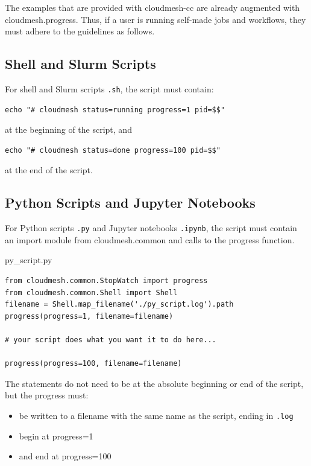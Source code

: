 The examples that are provided with cloudmesh-cc are already augmented
with cloudmesh.progress. Thus, if a user is running self-made jobs and
workflows, they must adhere to the guidelines as follows.

\subsection{Shell and Slurm Scripts}\label{shell-and-slurm-scripts}

For shell and Slurm scripts \texttt{.sh}, the script must contain:

\begin{verbatim}
echo "# cloudmesh status=running progress=1 pid=$$"
\end{verbatim}

at the beginning of the script, and

\begin{verbatim}
echo "# cloudmesh status=done progress=100 pid=$$"
\end{verbatim}

at the end of the script.

\subsection{Python Scripts and Jupyter
Notebooks}\label{python-scripts-and-jupyter-notebooks}

For Python scripts \texttt{.py} and Jupyter notebooks \texttt{.ipynb},
the script must contain an import module from cloudmesh.common and calls
to the progress function.

py\_script.py

\begin{verbatim}
from cloudmesh.common.StopWatch import progress
from cloudmesh.common.Shell import Shell
filename = Shell.map_filename('./py_script.log').path
progress(progress=1, filename=filename)

# your script does what you want it to do here...

progress(progress=100, filename=filename)
\end{verbatim}

The statements do not need to be at the absolute beginning or end of the
script, but the progress must:

\begin{itemize}
\item
  be written to a filename with the same name as the script, ending in
  \texttt{.log}
\item
  begin at progress=1
\item
  and end at progress=100
\end{itemize}
